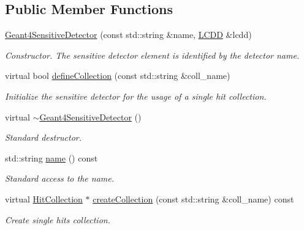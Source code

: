 \subsection*{Public Member Functions}
\begin{DoxyCompactItemize}
\item 
\hyperlink{class_d_d4hep_1_1_simulation_1_1_geant4_sensitive_detector_a2630f603ed8098fe28faa6b7c29b585d}{Geant4SensitiveDetector} (const std::string \&name, \hyperlink{class_d_d4hep_1_1_geometry_1_1_l_c_d_d}{LCDD} \&lcdd)
\begin{DoxyCompactList}\small\item\em Constructor. The sensitive detector element is identified by the detector name. \item\end{DoxyCompactList}\item 
virtual bool \hyperlink{class_d_d4hep_1_1_simulation_1_1_geant4_sensitive_detector_ad66e6523db65dab402beb511e438c2c9}{defineCollection} (const std::string \&coll\_\-name)
\begin{DoxyCompactList}\small\item\em Initialize the sensitive detector for the usage of a single hit collection. \item\end{DoxyCompactList}\item 
virtual \hyperlink{class_d_d4hep_1_1_simulation_1_1_geant4_sensitive_detector_a15bd6477c7c266c3478c59ac34b2fe31}{$\sim$Geant4SensitiveDetector} ()
\begin{DoxyCompactList}\small\item\em Standard destructor. \item\end{DoxyCompactList}\item 
std::string \hyperlink{class_d_d4hep_1_1_simulation_1_1_geant4_sensitive_detector_a64cea03962fea7ef96ce5daa21652bdf}{name} () const 
\begin{DoxyCompactList}\small\item\em Standard access to the name. \item\end{DoxyCompactList}\item 
virtual \hyperlink{class_d_d4hep_1_1_geometry_1_1_hit_collection}{HitCollection} $\ast$ \hyperlink{class_d_d4hep_1_1_simulation_1_1_geant4_sensitive_detector_ab787fe98fb6da409b9f342b9a20906f1}{createCollection} (const std::string \&coll\_\-name) const 
\begin{DoxyCompactList}\small\item\em Create single hits collection. \item\end{DoxyCompactList}\item 

\end{DoxyCompactItemize}
